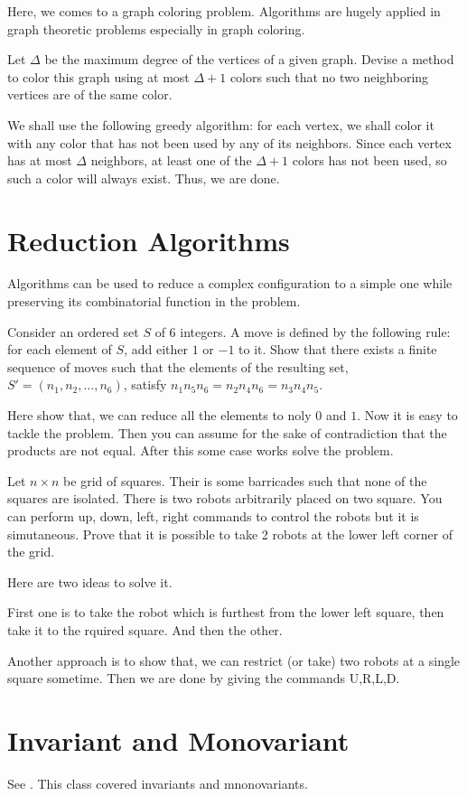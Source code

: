 Here, we comes to a graph coloring problem. 
Algorithms are hugely applied in graph 
theoretic problems especially in graph coloring.

\begin{example}
Let $\Delta$ be the maximum degree of the vertices of a given graph. Devise a method to
color this graph using at most $\Delta + 1$ colors such that no two neighboring vertices are of the same color.
\end{example}
We shall use the following greedy algorithm: for each vertex, we shall color it with any color that has
not been used by any of its neighbors. Since each vertex has at most $\Delta$ neighbors, at least one of the $\Delta + 1$
colors has not been used, so such a color will always exist. Thus, we are done.



\section{Reduction Algorithms}
Algorithms can be used to reduce a complex configuration to a simple one while preserving its combinatorial
function in the problem.
\begin{example}
Consider an ordered set $S$ of $6$ integers. A move is defined by the
following rule: for each element of $S$, add either $1$ or $-1$ to it. Show that there exists a finite sequence
of moves such that the elements of the resulting set, $S' = (n_1 , n_2 , \ldots , n_6)$, satisfy $n_1 n_5 n_6 = n_2 n_4 n_6 =
n_3 n_4 n_5$.
\end{example}
Here show that, we can reduce all the elements to noly $0$ and $1$. Now it is easy to tackle the problem. Then you can assume for the sake of contradiction that the products are not equal. After this some case works solve the problem.



\begin{example}[Canada MO]
Let $n\times n$ be grid of squares. Their is some barricades such that none of the squares are isolated. There is two robots arbitrarily placed on two square. You can perform up, down, left, right commands to control the robots but it is simutaneous. Prove that it is possible to take 2 robots at the lower left corner of the grid. 
\end{example}

Here are two ideas to solve it.

First one is to take the robot which is furthest from the lower left square, then take it to the rquired square. And then the other.

Another approach is to show that, we can restrict (or take) two robots at a single square sometime. Then we are done by giving the commands U,R,L,D.

\section{Invariant and Monovariant}
See . This class covered invariants and mnonovariants.


